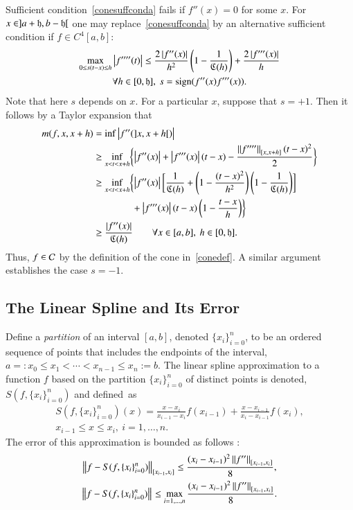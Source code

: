 \documentclass[review]{elsarticle}
\newcommand{\datasites}{\{x_i\}_{i=0}^n}
\theoremstyle{definition}
\begin{document}
Sufficient condition~\eqref{conesuffconda} fails if $f''(x) = 0$ for some $x$.
For $x \in ]a + \fh, b-\fh[$ one may replace~\eqref{conesuffconda} by an
alternative sufficient condition if $f \in C^4[a,b]$:
\begin{multline} \label{conesuffcondb}
\max_{0 \le s(t-x) \le h }{\abs{f''''(t)}} \le \frac{2\abs{f''(x)}}{h^2} \left( 1 - \frac{1}{\fC(h)} \right) +  \frac{2\abs{f'''(x)}}{h}  \\ \forall  h \in [0,\fh], \ s = \sign(f''(x)f'''(x)).
\end{multline}
Note that here $s$ depends on $x$. For a particular $x$, suppose that $s = +1$.
Then it follows by a Taylor expansion that
\begin{align*}
m(f,x,x+h) & = \inf \abs{f''(]x,x+h[)} \\
& \ge \inf_{x < t < x+h} \biggl\{ \abs{f''(x)} + \abs{f'''(x)}(t-x)  - \frac{\norm[{[x,x+h]}]{f''''}(t-x)^2}{2} \biggr\}\\
& \ge \inf_{x < t < x+h} \biggl\{ \abs{f''(x)} \biggl[ \frac{1}{\fC(h)} + \left(1 - \frac{(t-x)^2}{h^2}\right)\left(1 - \frac{1}{\fC(h)}\right) \biggr] \\
& \qquad \qquad + \abs{f'''(x)}(t-x)\left(1 -  \frac{t-x}{h}\right)  \biggr\}\\
& \ge  \frac{\abs{f''(x)}}{\fC(h)} \qquad \forall x \in [a,b],\ h \in [0,\fh].
\end{align*}
Thus, $f \in \cc$ by the definition of the cone in~\eqref{conedef}. A similar
argument establishes the case $s = -1$.

\subsection{The Linear Spline and Its Error} \label{subsec:spline}

Define a \emph{partition} of an interval $[a, b]$, denoted $\datasites$, to be
an ordered sequence of points that includes the endpoints of the interval,
$a=:x_0 \le x_1 < \cdots < x_{n-1} \le x_{n}:=b$. The linear spline
approximation to a function $f$ based on the partition $\datasites$ of distinct
points is denoted, $S(f,\datasites)$ and defined~as
\begin{multline} \label{splinedef}
S(f,\datasites)(x) =  \frac{x-x_i}{x_{i-1} - x_i} f(x_{i-1}) + \frac{x-x_{i-1}}{x_{i} - x_{i-1}}f(x_i), \\ x_{i-1} \le x \le x_i, \ i=1, \ldots, n.
\end{multline}
The error of this approximation is bounded as follows \cite[Theorem
3.3]{BurFaiBur16a}:
\begin{subequations} \label{appxerrbda}
\begin{gather}
\label{appxerrbdapc}
\norm[{[x_{i-1},x_i]}]{f - S(f,\datasites)} \le \frac{(x_i - x_{i-1})^2\norm[{[x_{i-1},x_i]}]{f''}}{8}, \\
\norm{f - S(f,\datasites)} \le \max_{i=1, \ldots, n} \frac{(x_i - x_{i-1})^2\norm[{[x_{i-1},x_i]}]{f''}}{8}.
\end{gather}
\end{subequations}
\end{document}
